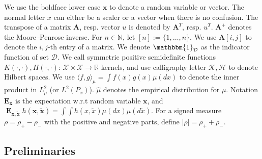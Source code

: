 \documentclass[11pt]{article}
\numberwithin{equation}{section}
\def\E{\mathop{\mathbf{E}}}
\def\bd#1{\mathbf{#1}}
\def\bx{\bd{x}}
\begin{document}
We use the boldface lower case $\bd{x}$ to denote a random variable or vector. The normal letter $x$ can either be a scaler or a vector when there is no confusion. The transpose of a matrix $\bd{A}$, resp. vector $u$ is denoted by $\bd{A}^T$, resp. $u^T$. $\bd{A}^+$ denotes the Moore–Penrose inverse. For $n\in\mathbb{N}$, let $[n]:=\{1,\dots,n\}$. We use $\mathbf{A}[i,j]$ to denote the $i,j$-th entry of a matrix. We denote $\mathbbm{1}_{\mathcal{D}}$ as the indicator function of set $\mathcal{D}$. We call symmetric positive semidefinite functions $K(\cdot,\cdot), H(\cdot, \cdot):\, \mathcal{X}\times\mathcal{X} \rightarrow \mathbb{R}$ kernels, and use calligraphy letter $\mathcal{K},\mathcal{H}$ to denote Hilbert spaces. We use $\langle f,g\rangle_{\mu} = \int f(x)g(x)\mu(dx)$ to denote the inner product in $L^2_\mu$ (or $L^2(P_x)$). $\hat{\mu}$ denotes the empirical distribution for $\mu$. Notation $\mathbf{E}_{\bx}$ is the expectation w.r.t random variable $\bx$, and $\E_{\bx, \bd{\tilde{x}}} h(\bx, \bd{\tilde{x}}) = \int \int h(x, \tilde{x}) \mu(dx) \mu(d \tilde{x})$. For a signed measure $\rho = \rho_+ - \rho_-$ with the positive and negative parts, define $|\rho| = \rho_+ + \rho_-$.

\subsection{Preliminaries}
\label{sec:preliminary}
\end{document}
